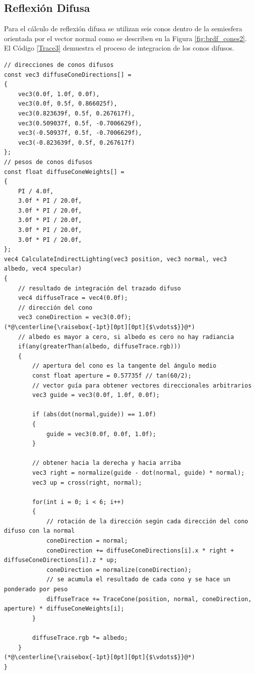 \subsection{Reflexión Difusa} %
\label{sub:reflexion_difuse}
Para el cálculo de reflexión difusa se utilizan seis conos dentro de la semiesfera orientada por el vector normal como se describen en la Figura \ref{fig:brdf_cones2}. El Código \ref{Trace3} demuestra el proceso de integracion de los conos difusos.
\\
\begin{lstlisting}[caption={Conos para reflexión difusa.}, label=Trace3]
// direcciones de conos difusos
const vec3 diffuseConeDirections[] =
{
    vec3(0.0f, 1.0f, 0.0f),
    vec3(0.0f, 0.5f, 0.866025f),
    vec3(0.823639f, 0.5f, 0.267617f),
    vec3(0.509037f, 0.5f, -0.7006629f),
    vec3(-0.50937f, 0.5f, -0.7006629f),
    vec3(-0.823639f, 0.5f, 0.267617f)
};
// pesos de conos difusos
const float diffuseConeWeights[] =
{
    PI / 4.0f,
    3.0f * PI / 20.0f,
    3.0f * PI / 20.0f,
    3.0f * PI / 20.0f,
    3.0f * PI / 20.0f,
    3.0f * PI / 20.0f,
};
vec4 CalculateIndirectLighting(vec3 position, vec3 normal, vec3 albedo, vec4 specular)
{
    // resultado de integración del trazado difuso
    vec4 diffuseTrace = vec4(0.0f);
    // dirección del cono
    vec3 coneDirection = vec3(0.0f);
(*@\centerline{\raisebox{-1pt}[0pt][0pt]{$\vdots$}}@*)
    // albedo es mayor a cero, si albedo es cero no hay radiancia
    if(any(greaterThan(albedo, diffuseTrace.rgb)))
    {
        // apertura del cono es la tangente del ángulo medio
        const float aperture = 0.57735f // tan(60/2);
        // vector guía para obtener vectores direccionales arbitrarios
        vec3 guide = vec3(0.0f, 1.0f, 0.0f);

        if (abs(dot(normal,guide)) == 1.0f)
        {
            guide = vec3(0.0f, 0.0f, 1.0f);
        }

        // obtener hacia la derecha y hacia arriba
        vec3 right = normalize(guide - dot(normal, guide) * normal);
        vec3 up = cross(right, normal);

        for(int i = 0; i < 6; i++)
        {
            // rotación de la dirección según cada dirección del cono difuso con la normal
            coneDirection = normal;
            coneDirection += diffuseConeDirections[i].x * right + diffuseConeDirections[i].z * up;
            coneDirection = normalize(coneDirection);
            // se acumula el resultado de cada cono y se hace un ponderado por peso
            diffuseTrace += TraceCone(position, normal, coneDirection, aperture) * diffuseConeWeights[i];
        }

        diffuseTrace.rgb *= albedo;
    }
(*@\centerline{\raisebox{-1pt}[0pt][0pt]{$\vdots$}}@*)
}
\end{lstlisting}

